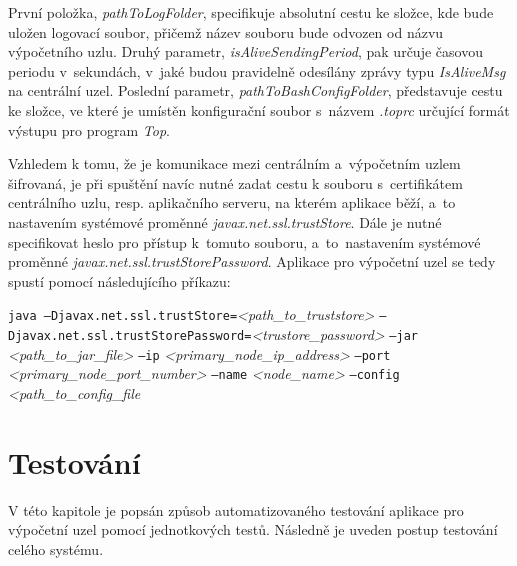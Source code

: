 První položka, \textit{pathToLogFolder}, specifikuje absolutní cestu ke složce, kde bude uložen logovací soubor, přičemž název souboru bude odvozen od názvu výpočetního uzlu. Druhý parametr, \textit{isAliveSendingPeriod}, pak určuje časovou periodu v~sekundách, v~jaké budou pravidelně odesílány zprávy typu \textit{IsAliveMsg} na centrální uzel. Poslední parametr, \textit{pathToBashConfigFolder}, představuje cestu ke složce, ve které je umístěn konfigurační soubor s~názvem \textit{.toprc} určující formát výstupu pro program \textit{Top}.

Vzhledem k tomu, že je komunikace mezi centrálním a~výpočetním uzlem šifrovaná, je při spuštění navíc nutné zadat cestu k souboru s~certifikátem centrálního uzlu, resp. aplikačního serveru, na kterém aplikace běží, a~to nastavením systémové proměnné \textit{javax.net.ssl.trustStore}. Dále je nutné specifikovat heslo pro přístup k~tomuto souboru, a~to~nastavením systémové proměnné \textit{javax.net.ssl.trustStorePassword}. Aplikace pro výpočetní uzel se tedy spustí pomocí následujícího příkazu:

\texttt{java --Djavax.net.ssl.trustStore=}\textit{<path\_to\_truststore>} \newline 
\hspace*{1.5cm} \texttt{--Djavax.net.ssl.trustStorePassword=}\textit{<trustore\_password>} \newline
\hspace*{1.5cm} \texttt{--jar} \hspace*{0.45cm} \textit{<path\_to\_jar\_file>} \newline
\hspace*{1.5cm} \texttt{--ip} \hspace*{0.65cm} \textit{<primary\_node\_ip\_address>} \newline
\hspace*{1.5cm} \texttt{--port} \hspace*{0.25cm} \textit{<primary\_node\_port\_number>} \newline
\hspace*{1.5cm} \texttt{--name} \hspace*{0.25cm} \textit{<node\_name>} \newline
\hspace*{1.5cm} \texttt{--config} \textit{<path\_to\_config\_file}


\chapter{Testování}
\label{chapter:testing}
V této kapitole je popsán způsob automatizovaného testování aplikace pro výpočetní uzel pomocí jednotkových testů. Následně je uveden postup testování celého systému.

